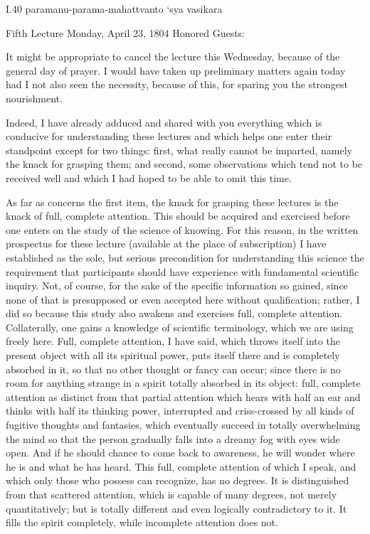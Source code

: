 I.40
paramanu-parama-mahattvanto ‘sya vasikara

Fifth Lecture
Monday, April 23, 1804
Honored Guests:

It might be appropriate to cancel the lecture this Wednesday,
because of the general day of prayer.
I would have taken up preliminary matters again today
had I not also seen the necessity, because of this,
for sparing you the strongest nourishment.

Indeed, I have already adduced and shared with you
everything which is conducive for understanding these lectures
and which helps one enter their standpoint except for two things:
first, what really cannot be imparted,
namely the knack for grasping them;
and second, some observations which tend
not to be received well and which
I had hoped to be able to omit this time.

As far as concerns the first item,
the knack for grasping these lectures is
the knack of full, complete attention.
This should be acquired and exercised
before one enters on the study of the science of knowing.
For this reason, in the written prospectus for these lecture
(available at the place of subscription)
I have established as the sole, but serious precondition
for understanding this science the requirement
that participants should have experience with
fundamental scientific inquiry.
Not, of course, for the sake of
the specific information so gained,
since none of that is presupposed
or even accepted here without qualification;
rather, I did so because this study also
awakens and exercises full, complete attention.
Collaterally, one gains a knowledge of scientific terminology,
which we are using freely here.
Full, complete attention, I have said,
which throws itself into the present object
with all its spiritual power,
puts itself there and is completely absorbed in it,
so that no other thought or fancy can occur;
since there is no room for anything strange
in a spirit totally absorbed in its object:
full, complete attention as distinct
from that partial attention
which hears with half an ear
and thinks with half its thinking power,
interrupted and criss-crossed by
all kinds of fugitive thoughts and fantasies,
which eventually succeed in totally overwhelming
the mind so that the person gradually falls
into a dreamy fog with eyes wide open.
And if he should chance to come back to awareness,
he will wonder where he is and what he has heard.
This full, complete attention of which I speak,
and which only those who possess can recognize, has no degrees.
It is distinguished from that scattered attention,
which is capable of many degrees, not merely quantitatively;
but is totally different and even logically contradictory to it.
It fills the spirit completely,
while incomplete attention does not.


